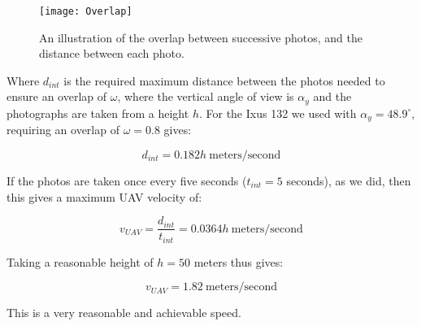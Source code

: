 \begin{wrapfigure}{r}{0.5\textwidth}
    \centering
    \texttt{[image: Overlap]}
    \caption{An illustration of the overlap between successive photos, and the
    distance between each photo.}
    \label{fig:overlap}
\end{wrapfigure}

Where $d_{int}$ is the required maximum distance between the photos needed to
ensure an overlap of $\omega$, where the vertical angle of view is $\alpha_y$
and the photographs are taken from a height $h$.  For the Ixus 132 we used with
$\alpha_y = 48.9^{\circ}$, requiring an overlap of $\omega = 0.8$ gives:

\begin{equation}
    d_{int} = 0.182h ~\mathrm{meters/second}
\end{equation}

If the photos are taken once every five seconds ($ t_{int} = 5 $ seconds), as we
did, then this gives a maximum UAV velocity of:

\begin{equation}
    v_{UAV} = \frac{d_{int}}{t_{int}} = 0.0364h ~\mathrm{meters/second}
\end{equation}

Taking a reasonable height of $ h = 50 $ meters thus gives:

\begin{equation}
    v_{UAV} = 1.82 ~\mathrm{meters/second}
\end{equation}

This is a very reasonable and achievable speed.
